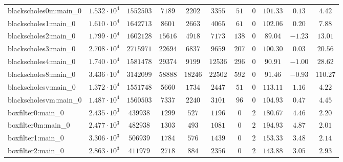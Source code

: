 \begin{tabular}{|l|c|c|c|c|c|c|c|c|c|c|}
blackscholes0m:main\_0         & $ 1.532 \cdot 10^{4} $ & $ 1552503  $ & $ 7189   $ & $ 2202   $ & $ 3355   $ & $ 51   $ & $ 0    $ & $ 101.33      $ & $ 0.13    $ & $ 4.42    $ \\
blackscholes1:main\_0          & $ 1.610 \cdot 10^{4} $ & $ 1642713  $ & $ 8601   $ & $ 2663   $ & $ 4065   $ & $ 61   $ & $ 0    $ & $ 102.06      $ & $ 0.20    $ & $ 7.88    $ \\
blackscholes2:main\_0          & $ 1.799 \cdot 10^{4} $ & $ 1602128  $ & $ 15616  $ & $ 4918   $ & $ 7173   $ & $ 138  $ & $ 0    $ & $ 89.04       $ & $ -1.23   $ & $ 13.01   $ \\
blackscholes3:main\_0          & $ 2.708 \cdot 10^{4} $ & $ 2715971  $ & $ 22694  $ & $ 6837   $ & $ 9659   $ & $ 207  $ & $ 0    $ & $ 100.30      $ & $ 0.03    $ & $ 20.56   $ \\
blackscholes4:main\_0          & $ 1.740 \cdot 10^{4} $ & $ 1581478  $ & $ 29374  $ & $ 9199   $ & $ 12536  $ & $ 296  $ & $ 0    $ & $ 90.91       $ & $ -1.00   $ & $ 28.62   $ \\
blackscholes8:main\_0          & $ 3.436 \cdot 10^{4} $ & $ 3142099  $ & $ 58888  $ & $ 18246  $ & $ 22502  $ & $ 592  $ & $ 0    $ & $ 91.46       $ & $ -0.93   $ & $ 110.27  $ \\
blackscholesv:main\_0          & $ 1.372 \cdot 10^{4} $ & $ 1551748  $ & $ 5660   $ & $ 1734   $ & $ 2447   $ & $ 51   $ & $ 0    $ & $ 113.11      $ & $ 1.16    $ & $ 4.22    $ \\
blackscholesvm:main\_0         & $ 1.487 \cdot 10^{4} $ & $ 1560503  $ & $ 7337   $ & $ 2240   $ & $ 3101   $ & $ 96   $ & $ 0    $ & $ 104.93      $ & $ 0.47    $ & $ 4.45    $ \\
boxfilter0:main\_0             & $ 2.435 \cdot 10^{3} $ & $ 439938   $ & $ 1299   $ & $ 527    $ & $ 1196   $ & $ 0    $ & $ 2    $ & $ 180.67      $ & $ 4.46    $ & $ 2.20    $ \\
boxfilter0m:main\_0            & $ 2.477 \cdot 10^{3} $ & $ 482938   $ & $ 1303   $ & $ 493    $ & $ 1081   $ & $ 0    $ & $ 2    $ & $ 194.93      $ & $ 4.87    $ & $ 2.01    $ \\
boxfilter1:main\_0             & $ 3.306 \cdot 10^{3} $ & $ 506939   $ & $ 1784   $ & $ 576    $ & $ 1439   $ & $ 0    $ & $ 2    $ & $ 153.33      $ & $ 3.48    $ & $ 2.14    $ \\
boxfilter2:main\_0             & $ 2.863 \cdot 10^{3} $ & $ 411979   $ & $ 2718   $ & $ 884    $ & $ 2356   $ & $ 0    $ & $ 2    $ & $ 143.88      $ & $ 3.05    $ & $ 2.93    $ \\

\end{tabular}
